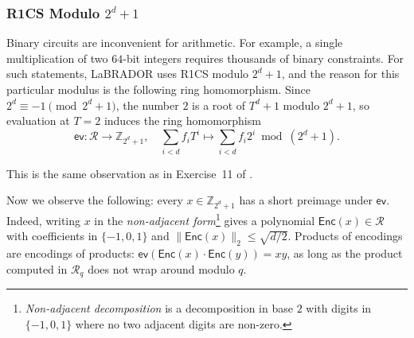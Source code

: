 \documentclass[../../book.tex]{subfiles}
\begin{document}
\begin{algoproto}[H]
\begin{mdframed}[linecolor=black, linewidth=1pt,
                     skipabove=10pt, skipbelow=10pt,
                     innerleftmargin=5pt, innerrightmargin=5pt]
\begin{minipage}[t]{0.46\linewidth}
\begin{algoen}
            \end{algoen}
        \end{minipage}
    \end{mdframed}
    \caption{Proof-of-knowledge reduction from binary R1CS to $\mathcal{R}_{\mathsf{dot}}$~\cite[Fig.~4]{C:BeuSei23}. The family $\mathcal{F}$ contains the opening $\mathbf{t} = \mathbf{A}_{\mathsf{R1CS}}(\mathbf{a}\,\|\,\mathbf{b}\,\|\,\mathbf{c}\,\|\,\mathbf{w})$, while the family $\mathcal{F}_{\mathsf{ct}}$ contains the constant-coefficient constraints for the conjugation relations such as $\widetilde{\mathbf{a}} = \mathbf{a}^{\ast}$, for the binarity of $\mathbf{a}$, $\mathbf{b}$, $\mathbf{c}$, $\mathbf{w}$, and $\mathbf{a} + \mathbf{b} - 2\mathbf{c}$, and for the correctness of the $e_i$.}
    \label{fig:labrador-binary-r1cs}
\end{algoproto}

\iffalse

\subsubsection{R1CS Modulo $2^d + 1$}

Binary circuits are inconvenient for arithmetic. For example, a single multiplication of two $64$-bit integers requires thousands of binary constraints.
For such statements, LaBRADOR uses R1CS modulo $2^d + 1$, and the reason for this particular modulus is the following ring homomorphism.
Since $2^d \equiv -1 \pmod{2^d + 1}$, the number $2$ is a root of $T^d + 1$ modulo $2^d + 1$, so evaluation at $T = 2$ induces the ring homomorphism
\begin{equation*}
    \mathsf{ev}: \mathcal{R} \to \mathbb{Z}_{2^d+1}, \quad \sum_{i < d} f_iT^i \mapsto \sum_{i < d} f_i2^i \bmod (2^d + 1).
\end{equation*}

\begin{remark}
    This is the same observation as in Exercise~11 of .    
\end{remark}

Now we observe the following: every $x \in \mathbb{Z}_{2^d+1}$ has a short preimage under $\mathsf{ev}$. 
Indeed, writing $x$ in the \emph{non-adjacent form}\footnote{\emph{Non-adjacent decomposition} is a decomposition in base $2$ with digits in $\{-1, 0, 1\}$ where no two adjacent digits are non-zero.} gives a polynomial $\mathsf{Enc}(x) \in \mathcal{R}$ with coefficients in $\{-1, 0, 1\}$ and $\|\mathsf{Enc}(x)\|_2 \leq \sqrt{d/2}$.
Products of encodings are encodings of products: $\mathsf{ev}(\mathsf{Enc}(x)\cdot\mathsf{Enc}(y)) = xy$, as long as the product computed in $\mathcal{R}_q$ does not wrap around modulo $q$.
\end{document}

